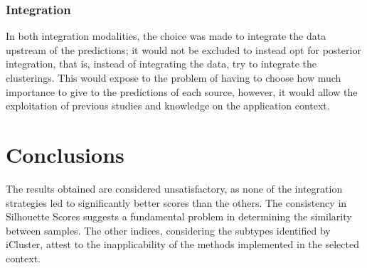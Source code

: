 \documentclass[12pt,a4paper]{article}
\begin{document}
\subsubsection{Integration}
In both integration modalities, the choice was made to integrate the data upstream of the predictions; it would not be excluded to instead opt for posterior integration, that is, instead of integrating the data, try to integrate the clusterings. This would expose to the problem of having to choose how much importance to give to the predictions of each source, however, it would allow the exploitation of previous studies and knowledge on the application context.

\pagebreak
\section{Conclusions}
The results obtained are considered unsatisfactory, as none of the integration strategies led to significantly better scores than the others. The consistency in Silhouette Scores suggests a fundamental problem in determining the similarity between samples. The other indices, considering the subtypes identified by iCluster, attest to the inapplicability of the methods implemented in the selected context.
\pagebreak



\end{document}
